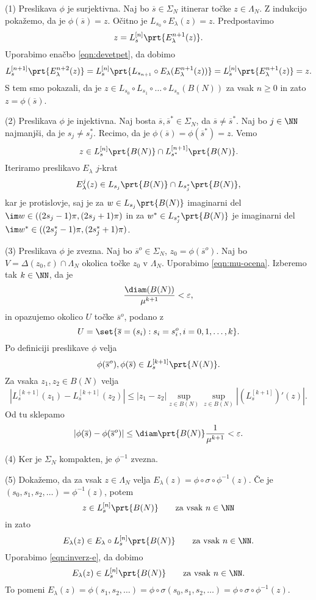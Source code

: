 \begin{dokaz}
    (1) Preslikava \(\phi\) je surjektivna. Naj bo \(\overline{s} \in \Sigma_N\) itinerar točke \(z \in \Lambda_N\). Z indukcijo pokažemo, da je \(\phi (\overline{s}) = z\). Očitno je \(L_{s_0} \circ E_\lambda (z) = z\). Predpostavimo
    \[z = L_{s}^{[n]} \prt{E_{\lambda}^{n + 1} (z)}.\]
    Uporabimo enačbo \eqref{eqn:devetpet}, da dobimo
    \[L_{s}^{[n + 1]} \prt{E_{\lambda}^{n + 2} (z)} = L_{s}^{[n]} \prt{L_{s_{n + 1}} \circ E_\lambda (E_\lambda^{n + 1} (z))} = L_{s}^{[n]} \prt{E_\lambda^{n + 1} (z)} = z.\]
    S tem smo pokazali, da je \(z \in L_{s_0} \circ L_{s_1} \circ \dots \circ L_{s_n} (B (N))\) za vsak \(n \geq 0\) in zato \(z = \phi (\overline{s})\).

    (2) Preslikava \(\phi\) je injektivna. Naj bosta \(\overline{s}, \overline{s}^* \in \Sigma_N\), da \(\overline{s} \neq \overline{s}^*\). Naj bo \(j \in \NN\) najmanjši, da je \(s_j \neq s_j^*\). Recimo, da je \(\phi (\overline{s}) = \phi (\overline{s}^*) = z\). Vemo
    \[z \in L_{s}^{[n]} \prt{B (N)} \cap L_{s^*}^{[n + 1]} \prt{B (N)}.\]
    Iteriramo preslikavo \(E_\lambda\) \(j\)-krat
    \[E_\lambda^j (z)\in L_{s_j} \prt{B (N)} \cap L_{s_j^*} \prt{B (N)},\]
    kar je protislovje, saj je za \(w \in L_{s_j} \prt{B (N)}\) imaginarni del \(\im w \in ((2 s_j - 1) \pi, (2 s_j + 1) \pi)\) in za \(w^* \in L_{s_j^*} \prt{B (N)}\) je imaginarni del \(\im w^* \in ((2 s_j^* - 1) \pi, (2 s_j^* + 1) \pi)\).

    (3) Preslikava \(\phi\) je zvezna. Naj bo \(\overline{s}^o \in \Sigma_N\), \(z_0 = \phi (\overline{s}^o)\). Naj bo \(V = \Delta (z_0, \varepsilon) \cap \Lambda_N\) okolica točke \(z_0\) v \(\Lambda_N\). Uporabimo \eqref{eqn:mu-ocena}. Izberemo tak \(k \in \NN\), da je
    \[\frac{\diam (B (N))}{\mu^{k + 1}} < \varepsilon,\]
    in opazujemo okolico \(U\) točke \(\overline{s}^o\), podano z
    \[U = \set{\overline{s} = (s_i) : s_i = s_i^o, i = 0, 1, \dots, k}.\]
    Po definiciji preslikave \(\phi\) velja
    \[\phi (\overline{s}^o), \phi (\overline{s}) \in L_s^{[k + 1]} \prt{N (N)}.\]
    Za vsaka \(z_1, z_2 \in B (N)\) velja
    \[\left| L_s^{[k + 1]} (z_1) - L_s^{[k + 1]} (z_2) \right| \leq |z_1 - z_2| \sup_{z \in B (N)} \sup_{z \in B (N)} \left| (L_s^{[k + 1]})' (z) \right|.\]
    Od tu sklepamo
    \[\left| \phi (\overline{s}) - \phi (\overline{s}^o) \right| \leq \diam \prt{B (N)} \frac{1}{\mu^{k + 1}} < \varepsilon.\]

    (4) Ker je \(\Sigma_N\) kompakten, je \(\phi^{-1}\) zvezna.

    (5) Dokažemo, da za vsak \(z \in \Lambda_N\) velja \(E_\lambda (z) = \phi \circ \sigma \circ \phi^{-1} (z)\). Če je \((s_0, s_1, s_2, \dots) = \phi^{-1} (z)\), potem
    \[z \in L_s^{[n]} \prt{B (N)} \qquad \text{za vsak } n \in \NN\]
    in zato
    \[E_\lambda (z) \in E_\lambda \circ L_s^{[n]} \prt{B (N)} \qquad \text{za vsak } n \in \NN.\]
    Uporabimo \eqref{eqn:inverz-e}, da dobimo
    \[E_\lambda (z) \in L_s^{[n]} \prt{B (N)} \qquad \text{za vsak } n \in \NN.\]
    To pomeni \(E_\lambda (z) = \phi (s_1, s_2, \dots) = \phi \circ \sigma (s_0, s_1, s_2, \dots) = \phi \circ \sigma \circ \phi^{-1} (z)\).
\end{dokaz}

